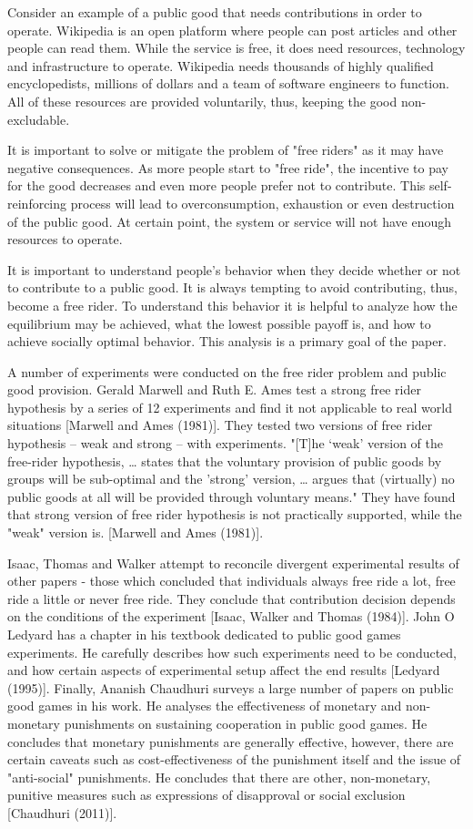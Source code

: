 	Consider an example of a public good that needs contributions in order to operate. Wikipedia is an open platform where people can post articles and other people can read them. While the service is free, it does need resources, technology and infrastructure to operate. Wikipedia needs thousands of highly qualified encyclopedists, millions of dollars and a team of software engineers to function. All of these resources are provided voluntarily, thus, keeping the good non-excludable.

	It is important to solve or mitigate the problem of "free riders" as it may have negative consequences. As more people start to "free ride", the incentive to pay for the good decreases and even more people prefer not to contribute. This self-reinforcing process will lead to overconsumption, exhaustion or even destruction of the public good. At certain point, the system or service will not have enough resources to operate.
	
	It is important to understand people's behavior when they decide whether or not to contribute to a public good. It is always tempting to avoid contributing, thus, become a free rider. To understand this behavior it is helpful to analyze how the equilibrium may be achieved, what the lowest possible payoff is, and how to achieve socially optimal behavior. This analysis is a primary goal of the paper.

	A number of experiments were conducted on the free rider problem and public good provision. Gerald Marwell and Ruth E. Ames test a strong free rider hypothesis by a series of 12 experiments and find it not applicable to real world situations [Marwell and Ames (1981)]. They tested two versions of free rider hypothesis – weak and strong – with experiments. "[T]he ‘weak' version of the free-rider hypothesis, … states that the voluntary provision of public goods by groups will be sub-optimal and the 'strong' version, … argues that (virtually) no public goods at all will be provided through voluntary means." They have found that strong version of free rider hypothesis is not practically supported, while the "weak" version is. [Marwell and Ames (1981)].
	
	Isaac, Thomas and Walker attempt to reconcile divergent experimental results of other papers - those which concluded that individuals always free ride a lot, free ride a little or never free ride. They conclude that contribution decision depends on the conditions of the experiment [Isaac, Walker and Thomas (1984)]. John O Ledyard has a chapter in his textbook dedicated to public good games experiments. He carefully describes how such experiments need to be conducted, and how certain aspects of experimental setup affect the end results [Ledyard (1995)]. Finally,  Ananish Chaudhuri surveys a large number of papers on public good games in his work. He analyses the effectiveness of monetary and non-monetary punishments on sustaining cooperation in public good games. He concludes that monetary punishments are generally effective, however, there are certain caveats such as cost-effectiveness of the punishment itself and the issue of "anti-social" punishments. He concludes that there are other, non-monetary, punitive measures such as expressions of disapproval or social exclusion [Chaudhuri (2011)].

